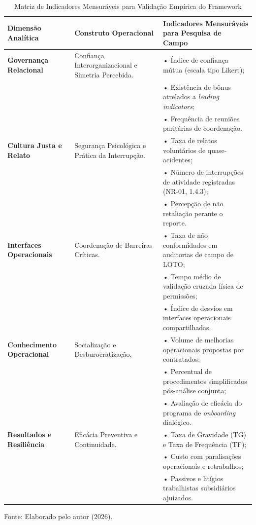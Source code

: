 \documentclass[12pt,a4paper]{article}
\begin{document}
\begin{table}[htbp]
\centering
\small\singlespacing
\caption{Matriz de Indicadores Mensuráveis para Validação Empírica do Framework}
\label{tab:indicadores}
\begin{tabularx}{\textwidth}{p{3.2cm}p{4.5cm}X}
\toprule
\textbf{Dimensão Analítica} & \textbf{Construto Operacional} & \textbf{Indicadores Mensuráveis para Pesquisa de Campo} \\
\midrule
\textbf{Governança Relacional} & Confiança Interorganizacional e Simetria Percebida. & • Índice de confiança mútua (escala tipo Likert);\\
& & • Existência de bônus atrelados a \textit{leading indicators};\\
& & • Frequência de reuniões paritárias de coordenação. \\
\addlinespace
\textbf{Cultura Justa e Relato} & Segurança Psicológica e Prática da Interrupção. & • Taxa de relatos voluntários de quase-acidentes;\\
& & • Número de interrupções de atividade registradas (NR-01, 1.4.3);\\
& & • Percepção de não retaliação perante o reporte. \\
\addlinespace
\textbf{Interfaces Operacionais} & Coordenação de Barreiras Críticas. & • Taxa de não conformidades em auditorias de campo de LOTO;\\
& & • Tempo médio de validação cruzada física de permissões;\\
& & • Índice de desvios em interfaces operacionais compartilhadas. \\
\addlinespace
\textbf{Conhecimento Operacional} & Socialização e Desburocratização. & • Volume de melhorias operacionais propostas por contratados;\\
& & • Percentual de procedimentos simplificados pós-análise conjunta;\\
& & • Avaliação de eficácia do programa de \textit{onboarding} dialógico. \\
\addlinespace
\textbf{Resultados e Resiliência} & Eficácia Preventiva e Continuidade. & • Taxa de Gravidade (TG) e Taxa de Frequência (TF);\\
& & • Custo com paralisações operacionais e retrabalhos;\\
& & • Passivos e litígios trabalhistas subsidiários ajuizados. \\
\bottomrule
\end{tabularx}
\begin{flushleft}
\footnotesize Fonte: Elaborado pelo autor (2026).
\end{flushleft}
\end{table}
\end{document}
